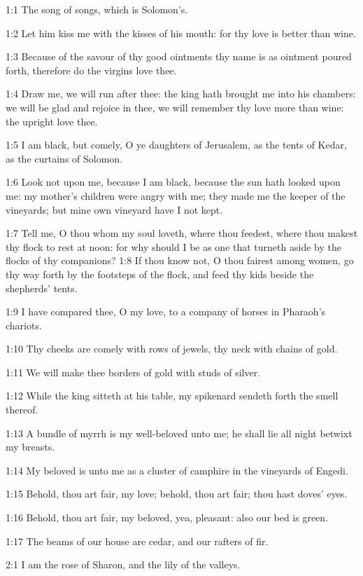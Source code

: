 

1:1 The song of songs, which is Solomon's.

1:2 Let him kiss me with the kisses of his mouth: for thy love is
better than wine.

1:3 Because of the savour of thy good ointments thy name is as
ointment poured forth, therefore do the virgins love thee.

1:4 Draw me, we will run after thee: the king hath brought me into his
chambers: we will be glad and rejoice in thee, we will remember thy
love more than wine: the upright love thee.

1:5 I am black, but comely, O ye daughters of Jerusalem, as the tents
of Kedar, as the curtains of Solomon.

1:6 Look not upon me, because I am black, because the sun hath looked
upon me: my mother's children were angry with me; they made me the
keeper of the vineyards; but mine own vineyard have I not kept.

1:7 Tell me, O thou whom my soul loveth, where thou feedest, where
thou makest thy flock to rest at noon: for why should I be as one that
turneth aside by the flocks of thy companions?  1:8 If thou know not,
O thou fairest among women, go thy way forth by the footsteps of the
flock, and feed thy kids beside the shepherds' tents.

1:9 I have compared thee, O my love, to a company of horses in
Pharaoh's chariots.

1:10 Thy cheeks are comely with rows of jewels, thy neck with chains
of gold.

1:11 We will make thee borders of gold with studs of silver.

1:12 While the king sitteth at his table, my spikenard sendeth forth
the smell thereof.

1:13 A bundle of myrrh is my well-beloved unto me; he shall lie all
night betwixt my breasts.

1:14 My beloved is unto me as a cluster of camphire in the vineyards
of Engedi.

1:15 Behold, thou art fair, my love; behold, thou art fair; thou hast
doves' eyes.

1:16 Behold, thou art fair, my beloved, yea, pleasant: also our bed is
green.

1:17 The beams of our house are cedar, and our rafters of fir.

2:1 I am the rose of Sharon, and the lily of the valleys.

